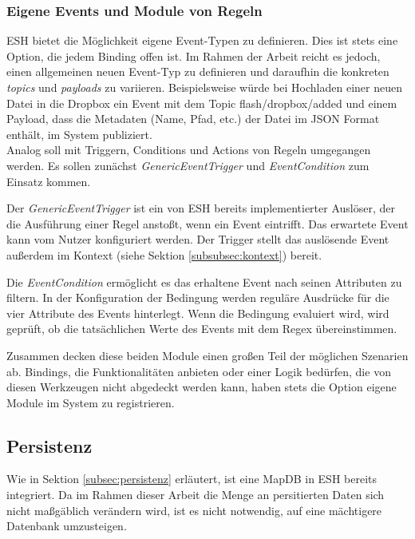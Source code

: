 \subsubsection{Eigene Events und Module von Regeln}
ESH bietet die Möglichkeit eigene Event-Typen zu definieren. Dies ist stets eine Option, die jedem Binding offen ist. Im Rahmen der Arbeit reicht es jedoch, einen allgemeinen neuen Event-Typ zu definieren und daraufhin die konkreten \textit{topics} und \textit{payloads} zu variieren. Beispielsweise würde bei Hochladen einer neuen Datei in die Dropbox ein Event mit dem Topic \glqq flash/dropbox/added\grqq{} und einem Payload, dass die Metadaten (Name, Pfad, etc.) der Datei im JSON Format enthält, im System publiziert.\\

Analog soll mit Triggern, Conditions und Actions von Regeln umgegangen werden. Es sollen zunächst \textit{GenericEventTrigger} und \textit{EventCondition} zum Einsatz kommen. 

Der \textit{GenericEventTrigger} ist ein von ESH bereits implementierter Auslöser, der die Ausführung einer Regel anstoßt, wenn ein Event eintrifft. Das erwartete Event kann vom Nutzer konfiguriert werden. Der Trigger stellt das auslösende Event außerdem im Kontext (siehe Sektion \ref{subsubsec:kontext}) bereit.

Die \textit{EventCondition} ermöglicht es das erhaltene Event nach seinen Attributen zu filtern. In der Konfiguration der Bedingung werden reguläre Ausdrücke für die vier Attribute des Events hinterlegt. Wenn die Bedingung evaluiert wird, wird geprüft, ob die tatsächlichen Werte des Events mit dem Regex übereinstimmen. 

Zusammen decken diese beiden Module einen großen Teil der möglichen Szenarien ab. Bindings, die Funktionalitäten anbieten oder einer Logik bedürfen, die von diesen Werkzeugen nicht abgedeckt werden kann, haben stets die Option eigene Module im System zu registrieren.




\subsection{Persistenz}
Wie in Sektion \ref{subsec:persistenz} erläutert, ist eine MapDB in ESH bereits integriert. Da im Rahmen dieser Arbeit die Menge an persitierten Daten sich nicht maßgäblich verändern wird, ist es nicht notwendig, auf eine mächtigere Datenbank umzusteigen. 

